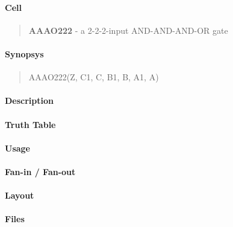 \label{AAAO222}
\paragraph{Cell}
\begin{quote}
    \textbf{AAAO222} - a 2-2-2-input AND-AND-AND-OR gate
\end{quote}

\paragraph{Synopsys}
\begin{quote}
    AAAO222(Z, C1, C, B1, B, A1, A)
\end{quote}

\paragraph{Description}

%

\paragraph{Truth Table}
%

\paragraph{Usage}

\paragraph{Fan-in / Fan-out}

\paragraph{Layout}

\paragraph{Files}
